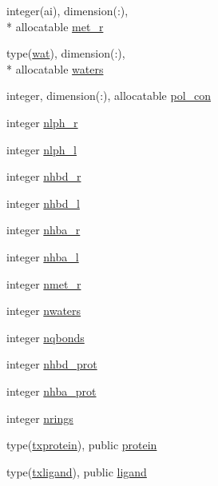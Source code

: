 \begin{DoxyCompactItemize}
\item 
integer(ai), dimension(\-:), \\*
allocatable \hyperlink{classcalc__xscore_a983ee8b7fc3d10fbee5e7a6813d15237}{met\-\_\-r}
\item 
type(\hyperlink{structcalc__xscore_1_1wat}{wat}), dimension(\-:), \\*
allocatable \hyperlink{classcalc__xscore_a0481484877299b3446ae0cf1c6cab1fc}{waters}
\item 
integer, dimension(\-:), allocatable \hyperlink{classcalc__xscore_a912319de67f79eb8a37652c5226ec7fc}{pol\-\_\-con}
\item 
integer \hyperlink{classcalc__xscore_a7be1f27a50f4224e7da2c0b513e43939}{nlph\-\_\-r}
\item 
integer \hyperlink{classcalc__xscore_ab072817178ff012a99fdd31d4537e28e}{nlph\-\_\-l}
\item 
integer \hyperlink{classcalc__xscore_a0f6eab8620160599c3b957f08b235396}{nhbd\-\_\-r}
\item 
integer \hyperlink{classcalc__xscore_a1e384673c947d9bba8c4788ac1a2f15c}{nhbd\-\_\-l}
\item 
integer \hyperlink{classcalc__xscore_aac8ba8e6621e14a461ddbdfe3f80b687}{nhba\-\_\-r}
\item 
integer \hyperlink{classcalc__xscore_a297e94c3e28ef0066c26754706eb1c57}{nhba\-\_\-l}
\item 
integer \hyperlink{classcalc__xscore_a1df505986db9df9844cf5dcdc9240158}{nmet\-\_\-r}
\item 
integer \hyperlink{classcalc__xscore_a972331c36facee43ec17c9fbe6f1d176}{nwaters}
\item 
integer \hyperlink{classcalc__xscore_a6a739af4d65860dd991b0487a33dcc70}{nqbonds}
\item 
integer \hyperlink{classcalc__xscore_a853d005c7ab5d762919b55604d83a274}{nhbd\-\_\-prot}
\item 
integer \hyperlink{classcalc__xscore_a19dc78b16e9640a9b3d34ad800cef862}{nhba\-\_\-prot}
\item 
integer \hyperlink{classcalc__xscore_aec9b7ef038158c34c0ef51739fefa270}{nrings}
\item 
type(\hyperlink{structcalc__xscore_1_1txprotein}{txprotein}), public \hyperlink{classcalc__xscore_a98803b585e24ba9794bf16dc263374dc}{protein}
\item 
type(\hyperlink{structcalc__xscore_1_1txligand}{txligand}), public \hyperlink{classcalc__xscore_ad2efc1238a463be4b83681419cd6b113}{ligand}
\item 

\end{DoxyCompactItemize}
